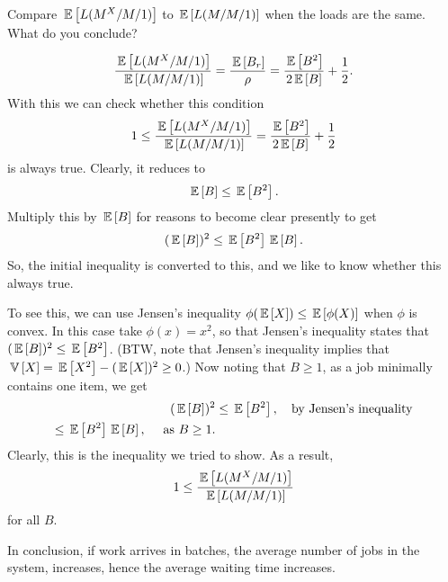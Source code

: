 \begin{question}
  Compare $\,\mathbb{E}\left[L(M^X/M/1)\right]$ to $\,\mathbb{E}\left[L(M/M/1)\right]$ when the loads are the
    same. What do you conclude?

  \begin{solution}
    \begin{equation*}
    \frac{\,\mathbb{E}\left[L(M^X/M/1)\right]}{\,\mathbb{E}\left[L(M/M/1)\right]} = \frac{\,\mathbb{E}\left[B_r\right]}{\rho} = 
\frac{\,\mathbb{E}\left[B^2\right]}{2\,\mathbb{E}\left[B\right]} + \frac 12.
    \end{equation*}
With this we can check whether this condition
    \begin{equation*}
    1\leq \frac{\,\mathbb{E}\left[L(M^X/M/1)\right]}{\,\mathbb{E}\left[L(M/M/1)\right]} = \frac{\,\mathbb{E}\left[B^2\right]}{2\,\mathbb{E}\left[B\right]} + \frac 12
    \end{equation*}
    is always true. Clearly, it reduces to
\begin{equation*}
\,\mathbb{E}\left[B\right] \leq  \,\mathbb{E}\left[B^2\right].
\end{equation*}
Multiply this by $\,\mathbb{E}\left[B\right]$ for reasons to become clear presently to get
\begin{equation*}
(\,\mathbb{E}\left[B\right])^2 \leq  \,\mathbb{E}\left[B^2\right] \,\mathbb{E}\left[B\right].
\end{equation*}
So, the initial inequality is converted to this, and we like to know
whether this always true.


To see this, we can use Jensen's inequality
$\phi(\,\mathbb{E}\left[X\right]) \leq \,\mathbb{E}\left[\phi(X)\right]$ when $\phi$ is convex. In this case take
$\phi(x)=x^2$, so that Jensen's inequality states that
$(\,\mathbb{E}\left[B\right])^2 \leq \,\mathbb{E}\left[B^2\right]$. (BTW, note that Jensen's inequality implies
that $\,\mathbb{V}\left[X\right] = \,\mathbb{E}\left[X^2\right] - (\,\mathbb{E}\left[X\right])^2\geq 0$.)  Now noting that $B\geq 1$, as a
job minimally contains one item, we get
\begin{equation*}
  \begin{split}
(\,\mathbb{E}\left[B\right])^2 
&\leq  \,\mathbb{E}\left[B^2\right], \quad{\text{by Jensen's inequality}} \\
\leq   \,\mathbb{E}\left[B^2\right] \,\mathbb{E}\left[B\right], \quad{\text{ as } B \geq 1}.
  \end{split}
\end{equation*}
Clearly, this is the inequality we tried to show. As a result,
    \begin{equation*}
    1\leq \frac{\,\mathbb{E}\left[L(M^X/M/1)\right]}{\,\mathbb{E}\left[L(M/M/1)\right]}
    \end{equation*}
for all $B$. 

In conclusion, if work arrives in batches, the average number of jobs
in the system, increases, hence the average waiting time increases.

  \end{solution}
\end{question}


